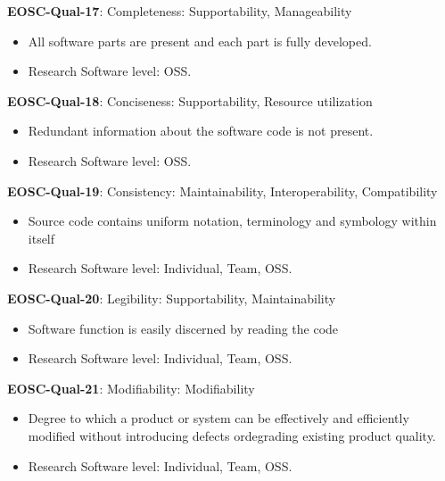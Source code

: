 \textbf{EOSC-Qual-17}: Completeness: Supportability, Manageability

\begin{itemize}
    \item All software parts are present and each part is fully developed. \cite{iso_25010_2011_2017,boehm_quantitative_1976}
    \item Research Software level: OSS.
\end{itemize}

\textbf{EOSC-Qual-18}: Conciseness: Supportability, Resource utilization

\begin{itemize}
    \item Redundant information about the software code is not present. \cite{boehm_quantitative_1976}
    \item Research Software level: OSS.
\end{itemize}

\textbf{EOSC-Qual-19}: Consistency: Maintainability, Interoperability, Compatibility

\begin{itemize}
    \item Source code contains uniform notation, terminology and symbology within itself \cite{boehm_quantitative_1976,raymond_software_2013}
    \item Research Software level: Individual, Team, OSS.
\end{itemize}

\textbf{EOSC-Qual-20}: Legibility: Supportability, Maintainability

\begin{itemize}
    \item Software function is easily discerned by reading the code \cite{boehm_quantitative_1976}
    \item Research Software level: Individual, Team, OSS.
\end{itemize}

\textbf{EOSC-Qual-21}: Modifiability: Modifiability

\begin{itemize}
    \item Degree to which a product or system can be effectively and efficiently modified without introducing defects ordegrading existing product quality. \cite{iso_25010_2011_2017,boehm_quantitative_1976}
    \item Research Software level: Individual, Team, OSS.
\end{itemize}

